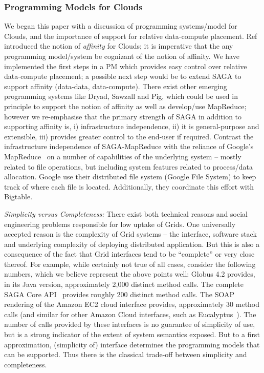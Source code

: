 \documentclass[conference,final]{IEEEtran}
\newcommand{\sagamapreduce }{SAGA-MapReduce }
\begin{document}
\subsubsection*{Programming Models for Clouds} We began this paper
with a discussion of programming systems/model for Clouds, and the
importance of support for relative data-compute
placement. Ref~\cite{jha_ccpe09} introduced the notion of {\it
  affinity} for Clouds; it is imperative that the any programming
model/system be cognizant of the notion of affinity. We have
implemented the first steps in a PM which provides easy control over
relative data-compute placement; a possible next step would be to
extend SAGA to support affinity (data-data, data-compute).  There
exist other emerging programming systems like Dryad, Sawzall and Pig,
which could be used in principle to support the notion of affinity as
well as develop/use MapReduce; however we re-emphasise that the
primary strength of SAGA in addition to supporting affinity is, i)
infrastructure independence, ii) it is general-purpose and extensible, iii)
provides greater control to the end-user if required.  Contrast the
infrastructure independence of \sagamapreduce with the reliance of
Google's MapReduce~\cite{mapreduce-paper} on a number of capabilities
of the underlying system -- mostly related to file operations, but
including system features related to process/data
allocation.  %
Google use their distributed file system (Google File System) to keep
track of where each file is located.  Additionally, they coordinate
this effort with Bigtable.


{\it Simplicity versus Completeness:} There exist both technical
reasons and social engineering problems responsible for low uptake of
Grids. One universally accepted reason is the complexity of Grid
systems -- the interface, software stack and underlying complexity of
deploying distributed application. But this is also a consequence of
the fact that Grid interfaces tend to be ``complete'' or very close
thereof.  For example, while certainly not true of all cases, consider
the following numbers, which we believe represent the above points
well: Globus 4.2 provides, in its Java version,
approximately 2,000 distinct method calls.  The complete SAGA Core
API~\cite{saga-core} provides roughly 200 distinct method calls.  The
SOAP rendering of the Amazon EC2 cloud interface provides,
approximately 30 method calls (and similar for other Amazon Cloud
interfaces, such as Eucalyptus~\cite{eucalyptus}).  The number of
calls provided by these interfaces is no guarantee of simplicity of
use, but is a strong indicator of the extent of system semantics
exposed.  But to a first approximation, (simplicity of) interface
determines the programming models that can be supported. Thus there is
the classical trade-off between simplicity and completeness.
\end{document}
